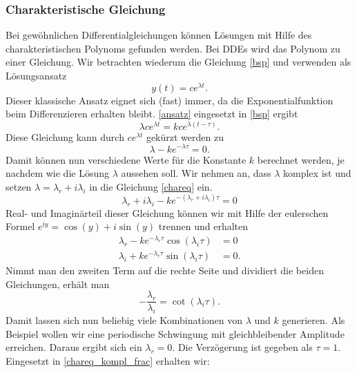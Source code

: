 \subsubsection{Charakteristische Gleichung}
Bei gewöhnlichen Differentialgleichungen können Lösungen mit Hilfe des charakteristischen Polynoms gefunden werden. 
Bei DDEs wird das Polynom zu einer Gleichung. 
Wir betrachten wiederum die Gleichung \eqref{bsp} und verwenden als Lösungsansatz
\begin{equation}\label{ansatz}
	y(t) = ce^{\lambda t}.
\end{equation}
Dieser klassische Ansatz eignet sich (fast) immer, da die Exponentialfunktion beim Differenzieren erhalten bleibt. 
\eqref{ansatz} eingesetzt in \eqref{bsp} ergibt
\begin{equation}
	\lambda ce^{\lambda t} = kce^{\lambda (t-\tau )}.
\end{equation} 
Diese Gleichung kann durch $ce^{\lambda t}$ gekürzt werden zu
\begin{equation}\label{chareq}
	\lambda  - ke^{-\lambda \tau}= 0.
\end{equation} 
Damit können nun verschiedene Werte für die Konstante $k$ berechnet werden, je nachdem wie die Lösung $\lambda$ aussehen soll.
Wir nehmen an, dass $\lambda$ komplex ist und setzen $\lambda = \lambda_r + i\lambda_i$ in die Gleichung \eqref{chareq} ein.
\begin{equation}\label{chareq_kompl}
	\lambda_r + i\lambda_i  - ke^{-(\lambda_r + i\lambda_i) \tau}= 0
\end{equation} 
Real- und Imaginärteil dieser Gleichung können wir mit Hilfe der eulerschen Formel $e^{iy}=\cos(y)+i\sin(y)$ trennen und erhalten
\begin{align}
	\lambda_r - ke^{-\lambda_r\tau}\cos(\lambda_i\tau)&=0 \label{realchar} \\
	\lambda_i + ke^{-\lambda_r\tau}\sin(\lambda_i\tau)&=0 \label{imagchar}.
\end{align}
Nimmt man den zweiten Term auf die rechte Seite und dividiert die beiden Gleichungen, erhält man
\begin{equation} \label{chareq_kompl_frac}
	-\frac{\lambda_r}{\lambda_i} = \cot(\lambda_i\tau).
\end{equation}
Damit lassen sich nun beliebig viele Kombinationen von $\lambda$ und $k$ generieren.
Als Beispiel wollen wir eine periodische Schwingung mit gleichbleibender Amplitude erreichen.
Daraus ergibt sich ein $\lambda_r = 0$. 
Die Verzögerung ist gegeben als $\tau = 1$.
Eingesetzt in \eqref{chareq_kompl_frac} erhalten wir:
